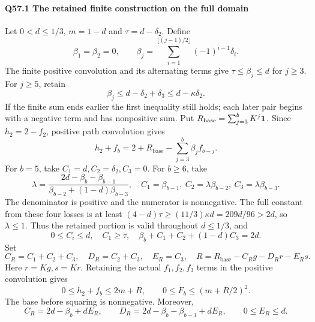\paragraph{Q57.1 The retained finite construction on the full domain}
Let \(0<\allowbreak d\le\allowbreak 1/3\), \(m=\allowbreak 1-d\) and \(\tau=\allowbreak d-\delta_2\). Define
\[
\beta_1=\beta_2=0,\qquad
\beta_j=\sum_{i=1}^{\lfloor(j-1)/2\rfloor}(-1)^{i-1}\delta_i .
\]
The finite positive convolution and its alternating terms give
\(\tau\le\allowbreak \beta_j\le\allowbreak  d\) for \(j\ge\allowbreak 3\). For \(j\ge\allowbreak 5\), retain
\[
\beta_j\le d-\delta_2+\delta_3\le d-\kappa \delta_2 . \tag{Q57.1.1}\label{eq:Q57:1.1}
\]
If the finite sum ends earlier the first inequality still holds; each later pair begins with a negative term and has nonpositive sum. Put
\(R_{\mathrm{base}}=\allowbreak \sum_{j=\allowbreak 3}^bK^j\mathbf1\).
Since \(h_2=\allowbreak 2-f_2\), positive path convolution gives
\[
h_2+f_b=2+R_{\mathrm{base}}-\sum_{j=3}^b\beta_j f_{b-j}.
\]
For \(b=\allowbreak 5\), take \(C_1=\allowbreak d,\allowbreak C_2=\allowbreak \delta_2,\allowbreak C_3=\allowbreak 0\).
For \(b\ge\allowbreak 6\), take
\[
\lambda=\frac{2d-\beta_b-\beta_{b-1}}
 {\beta_{b-2}+(1-d)\beta_{b-3}},\quad
C_1=\beta_{b-1},\ C_2=\lambda\beta_{b-2},\
C_3=\lambda\beta_{b-3}.
\]
The denominator is positive and the numerator is nonnegative. The full constant from these four losses is at least
\((4-d)\tau\ge\allowbreak (11/3)\kappa d=\allowbreak 209d/96>\allowbreak 2d\), so \(\lambda\le\allowbreak 1\).
Thus the retained portion is valid throughout \(d\le\allowbreak 1/3\), and
\[
0\le C_i\le d,\quad C_1\ge\tau,\quad
\beta_b+C_1+C_2+(1-d)C_3=2d .
\]
Set
\[
C_R=C_1+C_2+C_3,\quad D_R=C_2+C_3,\quad E_R=C_3,\quad
R=R_{\mathrm{base}}-C_Rg-D_Rr-E_Rs .
\]
Here \(r=\allowbreak Kg,\allowbreak s=\allowbreak Kr\). Retaining the actual \(f_1,\allowbreak f_2,\allowbreak f_3\) terms in the positive convolution gives
\[
0\le h_2+f_b\le2m+R,\qquad
0\le F_b\le(m+R/2)^2 . \tag{Q57.1.2}\label{eq:Q57:1.2}
\]
The base before squaring is nonnegative. Moreover,
\[
C_R=2d-\beta_b+dE_R,\qquad
D_R=2d-\beta_b-\beta_{b-1}+dE_R,\qquad0\le E_R\le d .
\tag{Q57.1.3}\label{eq:Q57:1.3}
\]


